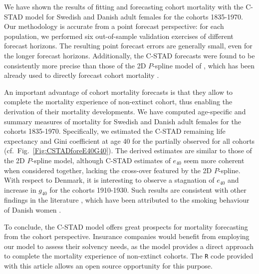 \documentclass[11pt, a4paper]{article}
\begin{document}
We have shown the results of fitting and forecasting cohort mortality with the C-STAD model for Swedish and Danish adult females for the cohorts 1835-1970. Our methodology is accurate from a point forecast perspective: for each population, we performed six out-of-sample validation exercises of different forecast horizons. The resulting point forecast errors are generally small, even for the longer forecast horizons. Additionally, the C-STAD forecasts were found to be consistently more precise than those of the 2D $P$-spline model of \cite{currie2004smoothing}, which has been already used to directly forecast cohort mortality \citep{cmi2007stochastic}. 

An important advantage of cohort mortality forecasts is that they allow to complete the mortality experience of non-extinct cohort, thus enabling the derivation of their mortality developments. We have computed age-specific and summary measures of mortality for Swedish and Danish adult females for the cohorts 1835-1970. Specifically, we estimated the C-STAD remaining life expectancy and Gini coefficient at age 40 for the partially observed for all cohorts (cf.~Fig.~\ref{Fig:CSTADforeE40G40}). The derived estimates are similar to those of the 2D $P$-spline model, although C-STAD estimates of $e_{40}$ seem more coherent when considered together, lacking the cross-over featured by the 2D $P$-spline. With respect to Denmark, it is interesting to observe a stagnation of $e_{40}$ and increase in $g_{40}$ for the cohorts 1910-1930. Such results are consistent with other findings in the literature \cite[see, e.g., Fig.~4 in][]{jacobsen2002long}, which have been attributed to the smoking behaviour of Danish women \citep{jacobsen2006causes,lindahl2016did}. 

To conclude, the C-STAD model offers great prospects for mortality forecasting from the cohort perspective. Insurance companies would benefit from employing our model to assess their solvency needs, as the model provides a direct approach to complete the mortality experience  of non-extinct cohorts. The \texttt{R} code provided with this article allows an open source opportunity for this purpose. 

\bigskip


\small
 

\appendix
{}
\normalsize
\end{document}
